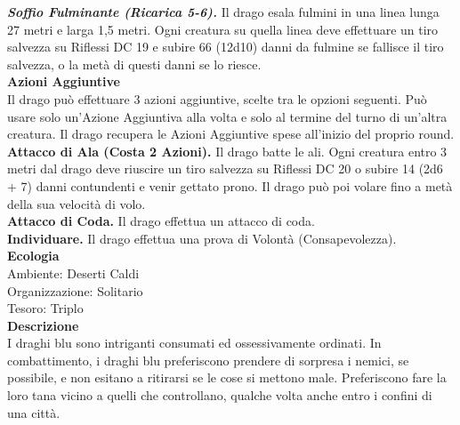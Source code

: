 \begin{multicols}{2}
\emph{\textbf{Soffio Fulminante (Ricarica 5-6).}} Il drago esala fulmini in una linea lunga 27 metri e larga 1,5 metri. Ogni creatura su quella linea deve effettuare un tiro salvezza su Riflessi DC 19 e subire 66 (12d10) danni da fulmine se fallisce il tiro salvezza, o la metà di questi danni se lo riesce.\\
\textbf{Azioni Aggiuntive}\\
Il drago può effettuare 3 azioni aggiuntive, scelte tra le opzioni seguenti. Può usare solo un'Azione Aggiuntiva alla volta e solo al termine del turno di un'altra creatura. Il drago recupera le Azioni Aggiuntive spese all'inizio del proprio round.\\
\textbf{Attacco di Ala (Costa 2 Azioni).} Il drago batte le ali. Ogni creatura entro 3 metri dal drago deve riuscire un tiro salvezza su Riflessi DC 20 o subire 14 (2d6 + 7) danni contundenti e venir gettato prono. Il drago può poi volare fino a metà della sua velocità di volo.\\
\textbf{Attacco di Coda.} Il drago effettua un attacco di coda.\\
\textbf{Individuare.} Il drago effettua una prova di Volontà (Consapevolezza).\\
\textbf{Ecologia}\\
Ambiente: Deserti Caldi\\
Organizzazione: Solitario\\
Tesoro: Triplo\\
\textbf{Descrizione}\\
I draghi blu sono intriganti consumati ed ossessivamente ordinati. In combattimento, i draghi blu preferiscono prendere di sorpresa i nemici, se possibile, e non esitano a ritirarsi se le cose si mettono male. Preferiscono fare la loro tana vicino a quelli che controllano, qualche volta anche entro i confini di una città.\\


\end{multicols}
